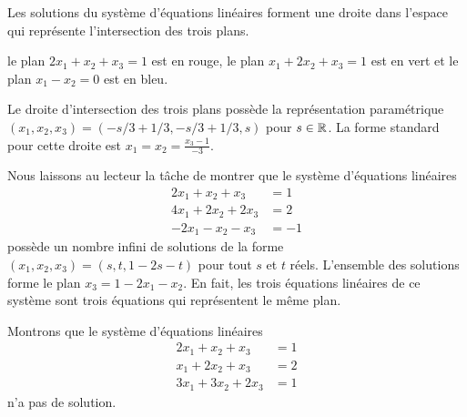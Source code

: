 {\begin{egg}

Les solutions du système d'équations linéaires forment une droite dans
l'espace qui représente l'intersection des trois plans.

\noindent le plan $2x_1 + x_2 + x_3 = 1$ est en rouge, le plan
$x_1 + 2x_2 + x_3 = 1$ est en vert et le plan $x_1 - x_2 = 0$ est en
bleu.

Le droite d'intersection des trois plans possède la représentation
paramétrique \\
$(x_1,x_2,x_3) = \left( -s/3 + 1/3, -s/3 + 1/3, s\right)$ pour $s \in \mathbb{R}$.
La forme standard pour cette droite est
$\displaystyle x_1 = x_2 = \frac{x_3-1}{-3}$. 
\end{egg}

\begin{egg}
Nous laissons au lecteur la tâche de montrer que le système d'équations
linéaires
\begin{align*}
2x_1 + x_2 + x_3 &= 1\\
4x_1 + 2x_2 + 2x_3 &= 2\\
-2x_1 - x_2 - x_3 &= -1
\end{align*}
possède un nombre infini de solutions de la forme
$(x_1,x_2,x_3) = (s,t,1-2s-t)$ pour tout $s$ et $t$ réels.  L'ensemble des
solutions forme le plan $x_3=1-2x_1-x_2$.  En fait, les trois équations
linéaires de ce système sont trois équations qui représentent le même
plan.
\end{egg}

\begin{egg}
Montrons que le système d'équations linéaires
\begin{equation}\label{ex3Syst3D1}
\begin{split}
2x_1 + x_2 + x_3 &= 1\\
x_1 + 2x_2 + x_3 &= 2\\
3x_1 + 3x_2 + 2x_3 &= 1
\end{split}
\end{equation}
n'a pas de solution.


\end{egg}}

